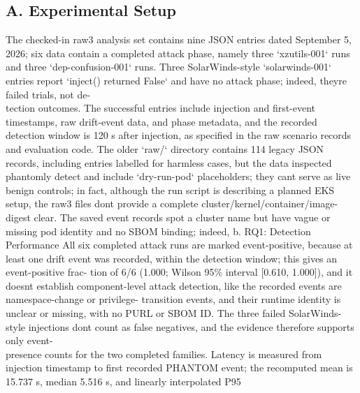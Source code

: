 \documentclass[conference]{IEEEtran}
\begin{document}
\subsection*{A. Experimental Setup}
The checked-in raw3 analysis set contains nine JSON entries dated September 5, 2026; six data contain a completed attack phase, namely three `xzutils-001` runs and three `dep-confusion-001` runs. Three SolarWinds-style `solarwinds-001` entries report `inject() returned False` and have no attack phase; indeed, they\textquotesingle re failed trials, not de-\\tection outcomes. The successful entries include injection and first-event timestamps, raw drift-event data, and phase metadata, and the recorded detection window is 120 s after injection, as specified in the raw scenario records and evaluation code. The older `raw/` directory contains 114 legacy JSON records, including entries labelled for harmless cases, but the data inspected phantomly detect and include `dry-run-pod` placeholders; they can\textquotesingle t serve as live benign controls; in fact, although the run script is describing a planned EKS setup, the raw3 files don\textquotesingle t provide a complete cluster/kernel/container/image-digest clear. The saved event records spot a cluster name but have vague or missing pod identity and no SBOM binding; indeed, b. RQ1: Detection Performance All six completed attack runs are marked event-positive, because at least one drift event was recorded, within the detection window; this gives an event-positive frac- tion of 6/6 (1.000; Wilson 95\% interval {[}0.610, 1.000{]}), and it doesn\textquotesingle t establish component-level attack detection, like the recorded events are namespace-change or privilege- transition events, and their runtime identity is unclear or missing, with no PURL or SBOM ID. The three failed SolarWinds-style injections don\textquotesingle t count as false negatives, and the evidence therefore supports only event-\\presence counts for the two completed families. Latency is measured from injection timestamp to first recorded PHANTOM event; the recomputed mean is 15.737 s, median 5.516 s, and linearly interpolated P95
\end{document}

